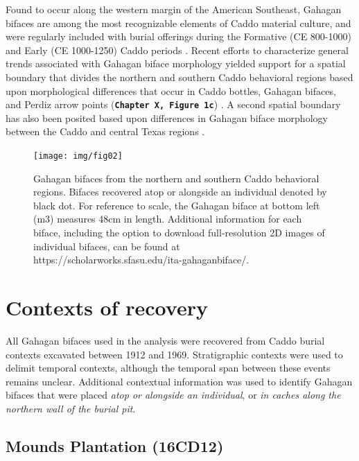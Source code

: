 \documentclass[]{interact}
\theoremstyle{plain}%
\theoremstyle{definition}
\theoremstyle{remark}
\begin{document}
Found to occur along the western margin of the American Southeast,
Gahagan bifaces are among the most recognizable elements of Caddo
material culture, and were regularly included with burial offerings
during the Formative (CE 800-1000) and Early (CE 1000-1250) Caddo
periods \citep{RN7115,RN8189,RN5746,RN8186,RN8174,RN8176}. Recent
efforts to characterize general trends associated with Gahagan biface
morphology yielded support for a spatial boundary that divides the
northern and southern Caddo behavioral regions based upon morphological
differences that occur in Caddo bottles, Gahagan bifaces, and Perdiz
arrow points (\textbf{\texttt{Chapter\ X,\ Figure\ 1c}})
\citep{RN7925,RN8071,RN8361,RN8967,RN11064,RN8154}. A second spatial
boundary has also been posited based upon differences in Gahagan biface
morphology between the Caddo and central Texas regions \citep{RN8318}.

\begin{figure}

{\centering \texttt{[image: img/fig02]} 

}

\caption{Gahagan bifaces from the northern and southern Caddo behavioral regions. Bifaces recovered atop or alongside an individual denoted by black dot. For reference to scale, the Gahagan biface at bottom left (m3) measures 48cm in length. Additional information for each biface, including the option to download full-resolution 2D images of individual bifaces, can be found at https://scholarworks.sfasu.edu/ita-gahaganbiface/.}\label{fig:gahagan bifaces 2D}
\end{figure}

\hypertarget{contexts-of-recovery}{%
\section{Contexts of recovery}\label{contexts-of-recovery}}

All Gahagan bifaces used in the analysis were recovered from Caddo
burial contexts excavated between 1912 and 1969. Stratigraphic contexts
were used to delimit temporal contexts, although the temporal span
between these events remains unclear. Additional contextual information
was used to identify Gahagan bifaces that were placed \emph{atop or
alongside an individual}, or \emph{in caches along the northern wall of
the burial pit}.

\hypertarget{mounds-plantation-16cd12}{%
\subsection{Mounds Plantation (16CD12)}\label{mounds-plantation-16cd12}}
\end{document}
